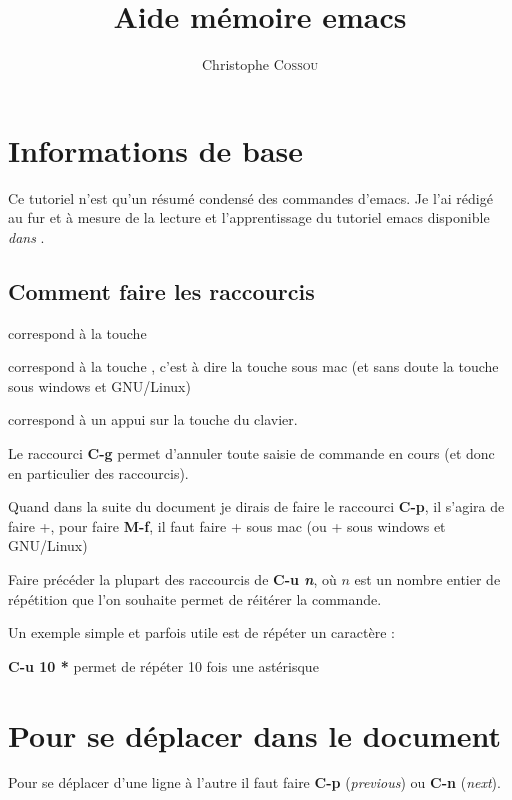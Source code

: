 \documentclass[a4paper,twoside]{article}
\title{Aide mémoire emacs}
\author{Christophe \textsc{Cossou}}
\newcommand{\raccourci}[1]{{\bfseries #1}}
\begin{document}
\tableofcontents

\clearpage
\section{Informations de base}
Ce tutoriel n'est qu'un résumé condensé des commandes d'emacs. Je l'ai rédigé au fur et à mesure de la lecture et l'apprentissage du tutoriel emacs disponible \emph{dans} .
\subsection{Comment faire les raccourcis}
\og \raccourci{C}\fg correspond à la touche 

\og \raccourci{M}\fg correspond à la touche , c'est à dire la touche  sous mac (et sans doute la touche  sous windows et GNU/Linux)

\og \raccourci{<RET>}\fg correspond à un appui sur la touche  du clavier.

\begin{remarque}
Le raccourci \raccourci{C-g} permet d'annuler toute saisie de commande en cours (et donc en particulier des raccourcis).
\end{remarque}

\begin{exemple}
Quand dans la suite du document je dirais de faire le raccourci \raccourci{C-p}, il s'agira de faire +, pour faire \raccourci{M-f}, il faut faire + sous mac (ou + sous windows et GNU/Linux)
\end{exemple}

\begin{remarque}
Faire précéder la plupart des raccourcis de \raccourci{C-u \emph{n}}, où $n$ est un nombre entier de répétition que l'on souhaite permet de réitérer la commande. 

Un exemple simple et parfois utile est de répéter un caractère : 
\begin{exemple}
\raccourci{C-u 10 *} permet de répéter 10 fois une astérisque
\end{exemple}

\end{remarque}


\section{Pour se déplacer dans le document}
Pour se déplacer d'une ligne à l'autre il faut faire \raccourci{C-p} (\emph{previous}) ou \raccourci{C-n} (\emph{next}).
\end{document}
